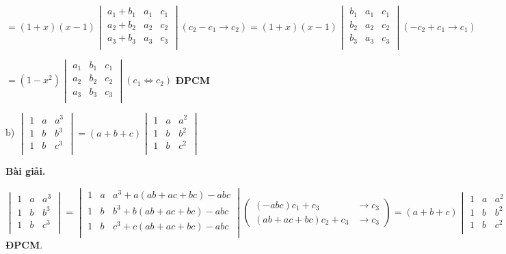 \documentclass[12pt]{report}
\begin{document}
$= (1+x)(x-1)\begin{vmatrix}
	a_1+b_1 & a_1 & c_1 \\
	a_2+b_2 & a_2 & c_2 \\
	a_3+b_3 & a_3 & c_3 \\
\end{vmatrix} (c_2 - c_1 \to c_2) = (1+x)(x-1) \begin{vmatrix}
b_1 & a_1 & c_1 \\ 
b_2 & a_2 & c_2 \\
b_3 & a_3 & c_3 \\
\end{vmatrix} (-c_2 +c_1 \to c_1)$

$= (1-x^2) \begin{vmatrix}
	a_1 & b_1 & c_1 \\ 
	a_2 & b_2 & c_2 \\
	a_3 & b_3 & c_3 \\
\end{vmatrix} (c_1 \Leftrightarrow c_2)$ \textbf{ĐPCM}

b) $\begin{vmatrix}
	1 & a & a^3 \\
	1 & b & b^3 \\
	1 & b & c^3 \\
\end{vmatrix} = (a+b+c) \begin{vmatrix}
	1 & a & a^2 \\
	1 & b & b^2 \\
	1 & b & c^2 \\
\end{vmatrix}$

\textbf{Bài giải.} 

$\begin{vmatrix}
	1 & a & a^3 \\
	1 & b & b^3 \\
	1 & b & c^3 \\
\end{vmatrix} = \begin{vmatrix}
1 & a & a^3 + a(ab+ac+bc) - abc \\
1 & b & b^3 + b(ab+ac+bc) - abc \\
1 & b & c^3 + c(ab+ac+bc) - abc \\
\end{vmatrix} \left( \begin{smallmatrix}
(-abc)c_1 + c_3 &\to c_3 \\ (ab+ac+bc)c_2 + c_3 &\to c_3
\end{smallmatrix} \right) = (a+b+c) \begin{vmatrix}
1 & a & a^2 \\
1 & b & b^2 \\
1 & b & c^2 \\
\end{vmatrix}$ \textbf{ĐPCM}.
\end{document}
